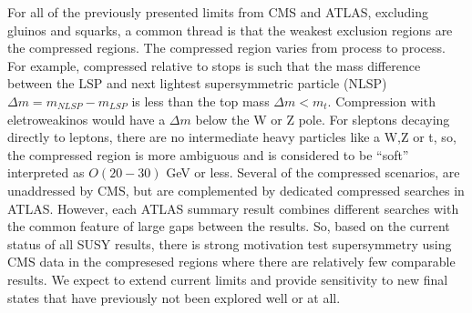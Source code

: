 

For all of the previously presented limits from CMS and ATLAS, excluding gluinos and squarks, a common thread is that the weakest exclusion regions are the compressed regions. The compressed region varies from process to process. For example, compressed relative to stops is such that the mass difference between the LSP and next lightest supersymmetric particle (NLSP) $\Delta m = m_{NLSP} - m_{LSP}$ is less than the top mass $\Delta m < m_t$. Compression with eletroweakinos would have a $\Delta m$  below the W or Z pole. For sleptons decaying directly to leptons, there are no intermediate heavy particles like a W,Z or t, so, the compressed region is more ambiguous and is considered to be ``soft'' interpreted as $O(20-30)$ GeV or less. Several of the compressed scenarios, are unaddressed by CMS, but are complemented by dedicated compressed searches in ATLAS. However, each ATLAS summary result combines different searches with the common feature of large gaps between the results. So, based on the current status of all SUSY results, there is strong motivation test supersymmetry using CMS data in the compresesed regions where there are relatively few comparable results. We expect to extend current limits and provide sensitivity to new final states that have previously not been explored well or at all.

